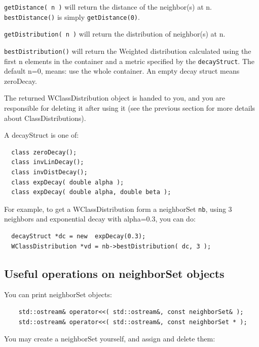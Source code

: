\documentclass{report}
\begin{document}
{\tt getDistance( n )} will return the distance of the neighbor(s) at n.
{\tt bestDistance()} is simply {\tt getDistance(0)}.

{\tt getDistribution( n )} will return the distribution of neighbor(s) at
n.

{\tt bestDistribution()} will return the Weighted distribution
calculated using the first n elements in the container and a metric
specified by the {\tt decayStruct}.  The default n=0, means: use the
whole container. An empty decay struct means zeroDecay.

The returned WClassDistribution object is handed to you, and you are
responsible for deleting it after using it (see the previous section
for more details about ClassDistributions).

A decayStruct is one of:

\begin{footnotesize}
\begin{verbatim}
  class zeroDecay();
  class invLinDecay();
  class invDistDecay();
  class expDecay( double alpha );
  class expDecay( double alpha, double beta );
\end{verbatim}
\end{footnotesize}

For example, to get a WClassDistribution form a neighborSet {\tt nb}, using
3 neighbors and exponential decay with alpha=0.3, you can do:

\begin{footnotesize}
\begin{verbatim}
  decayStruct *dc = new  expDecay(0.3);
  WClassDistribution *vd = nb->bestDistribution( dc, 3 );
\end{verbatim}
\end{footnotesize}


\subsection{Useful operations on neighborSet objects}

You can print neighborSet objects:

\begin{footnotesize}
\begin{verbatim}
    std::ostream& operator<<( std::ostream&, const neighborSet& );
    std::ostream& operator<<( std::ostream&, const neighborSet * );
\end{verbatim}
\end{footnotesize}

You may create a neighborSet yourself, and assign and delete them:
\end{document}

